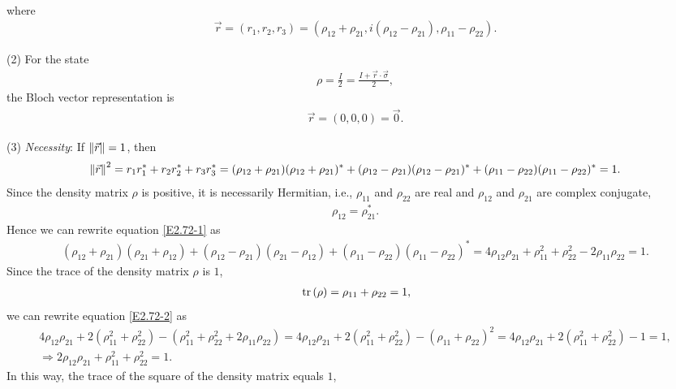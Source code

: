 \documentclass[en]{sol-man}
\begin{document}
\begin{sol}
\begin{align}
    \end{align}
    where
    \begin{align}
        \vec{r}=(r_1,r_2,r_3)=(\rho_{12}+\rho_{21},i(\rho_{12}-\rho_{21}),\rho_{11}-\rho_{22}).
    \end{align}
    \item[(2)] For the state
    \begin{align}
        \rho=\frac{I}{2}=\frac{I+\vec{r}\cdot\vec{\sigma}}{2},
    \end{align}
    the Bloch vector representation is
    \begin{align}
        \vec{r}=(0,0,0)=\vec{0}.
    \end{align}
    \item[(3)] \emph{Necessity}: If $\left\lVert\vec{r}\right\rVert=1$, then
    \begin{align}
        \label{E2.72-1}
        \left\lVert\vec{r}\right\rVert^2=r_1r_1^*+r_2r_2^*+r_3r_3^*=(\rho_{12}+\rho_{21})(\rho_{12}+\rho_{21})^*+(\rho_{12}-\rho_{21})(\rho_{12}-\rho_{21})^*+(\rho_{11}-\rho_{22})(\rho_{11}-\rho_{22})^*=1.
    \end{align}
    Since the density matrix $\rho$ is positive, it is necessarily Hermitian, i.e., $\rho_{11}$ and $\rho_{22}$ are real and $\rho_{12}$ and $\rho_{21}$ are complex conjugate,
    \begin{align}
        \rho_{12}=\rho_{21}^*.
    \end{align}
    Hence we can rewrite equation \eqref{E2.72-1} as
    \begin{align}
        \label{E2.72-2}
        (\rho_{12}+\rho_{21})(\rho_{21}+\rho_{12})+(\rho_{12}-\rho_{21})(\rho_{21}-\rho_{12})+(\rho_{11}-\rho_{22})(\rho_{11}-\rho_{22})^*=4\rho_{12}\rho_{21}+\rho_{11}^2+\rho_{22}^2-2\rho_{11}\rho_{22}=1.
    \end{align}
    Since the trace of the density matrix $\rho$ is $1$,
    \begin{align}
        \,\mathrm{tr}\,(\rho)=\rho_{11}+\rho_{22}=1,
    \end{align}
    we can rewrite equation \eqref{E2.72-2} as
    \begin{gather}
        4\rho_{12}\rho_{21}+2(\rho_{11}^2+\rho_{22}^2)-(\rho_{11}^2+\rho_{22}^2+2\rho_{11}\rho_{22})=4\rho_{12}\rho_{21}+2(\rho_{11}^2+\rho_{22}^2)-(\rho_{11}+\rho_{22})^2=4\rho_{12}\rho_{21}+2(\rho_{11}^2+\rho_{22}^2)-1=1,\\
        \Longrightarrow 2\rho_{12}\rho_{21}+\rho_{11}^2+\rho_{22}^2=1.
    \end{gather}
    In this way, the trace of the square of the density matrix equals $1$,

\end{sol}
\end{document}
